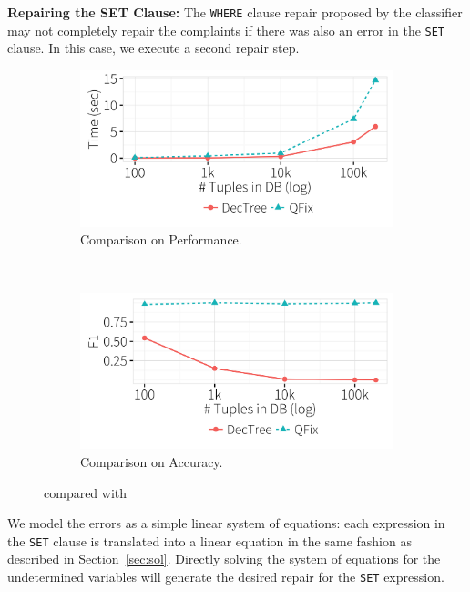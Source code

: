 \noindent
\textbf{Repairing the SET Clause:}
The \texttt{WHERE} clause repair proposed by the classifier may not completely repair 
the complaints if there was also an error in the \texttt{SET} clause. 
In this case, we execute a second repair step.
\begin{figure}[!htb]
\centering
  \begin{subfigure} [t]{.75\columnwidth}
  \includegraphics[width = \columnwidth]{figures/heuristictime}
  \caption{Comparison on Performance.}
  \label{f:heuristic_time} 
  \end{subfigure}\\

  \begin{subfigure} [t]{.75\columnwidth}
  \includegraphics[width = \columnwidth]{figures/heuristicacc}
  \caption{Comparison on Accuracy.}
  \label{f:heuristic_acc} 
  \end{subfigure}
 \caption{\dt compared with \sys}
 \label{f:heuristic}
\end{figure}

We model the errors as a simple linear system of equations: 
each expression in the \texttt{SET} clause is translated into a
linear equation in the same fashion as described in Section~\ref{sec:sol}.
Directly solving the system of equations for the undetermined variables 
will generate the desired repair for the \texttt{SET} expression.



